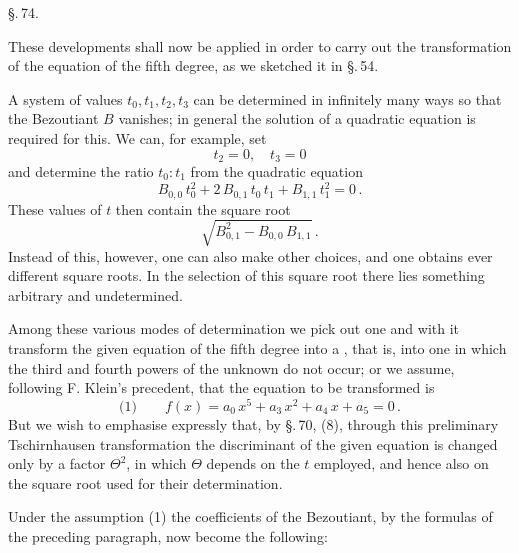 

\begin{center}
\S.\,74.

\end{center}

\indent These developments shall now be applied in order to carry
out the transformation of the equation of the fifth degree, as we
sketched it in \S.\,54.

\indent A system of values $t_0, t_1, t_2, t_3$ can be determined in
infinitely many ways so that the Bezoutiant $B$ vanishes; in general
the solution of a quadratic equation is required for this. We can,
for example, set
\[
t_2 = 0, \quad t_3 = 0
\]
and determine the ratio $t_0 : t_1$ from the quadratic equation
\[
B_{0,0}\,t_0^2 + 2\,B_{0,1}\,t_0\,t_1 + B_{1,1}\,t_1^2 = 0\,.
\]
These values of $t$ then contain the square root
\[
\sqrt{B_{0,1}^2 - B_{0,0}\,B_{1,1}}\,.
\]
Instead of this, however, one can also make other choices, and one
obtains ever different square roots. In the selection of this square
root there lies something arbitrary and undetermined.

\indent Among these various modes of determination we pick out one
and with it transform the given equation of the fifth degree into a
, that is, into one in which the third
and fourth powers of the unknown do not occur; or we assume, following
F. Klein's precedent, that the equation to be transformed is 
\[
\text{(1)} \qquad f(x) = a_0\,x^5 + a_3\,x^2 + a_4\,x + a_5 = 0\,.
\]
But we wish to emphasise expressly that, by \S.\,70, (8), through this
preliminary Tschirnhausen transformation the discriminant of the given
equation is changed only by a factor $\Theta^2$, in which $\Theta$
depends  on the $t$ employed, and hence also on the square
root used for their determination.

\indent Under the assumption (1) the coefficients of the Bezoutiant,
by the formulas of the preceding paragraph, now become the following:
